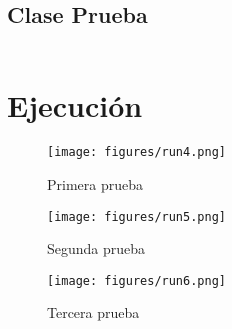 \documentclass[12pt]{article}
\begin{document}
\subsection*{Clase Prueba}
\inputminted{Java}{Prueba.java}

\section*{Ejecución}
\begin{figure}[ht]
  \centering
  \texttt{[image: figures/run4.png]}
  \caption{Primera prueba}
\end{figure}
\begin{figure}[ht]
  \centering
  \texttt{[image: figures/run5.png]}
  \caption{Segunda prueba}
\end{figure}
\begin{figure}[ht]
  \centering
  \texttt{[image: figures/run6.png]}
  \caption{Tercera prueba}
\end{figure}
\end{document}

